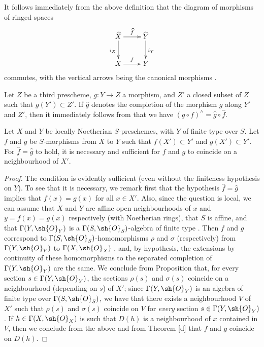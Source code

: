 \begin{env}[10.9.2]
\label{I.10.9.2}
It follows immediately from the above definition that the diagram of morphisms of ringed spaces
\[
  \xymatrix{
    \widehat{X}\ar[r]^{\widehat{f}}\ar[d]_{i_X} &
    \widehat{Y}\ar[d]^{i_Y}\\
    X\ar[r]^f &
    Y
  }
\]
commutes, with the vertical arrows being the canonical morphisms .
\end{env}

\begin{env}[10.9.3]
\label{I.10.9.3}
Let $Z$ be a third prescheme, $g:Y\to Z$ a morphism, and $Z'$ a closed subset of $Z$ such that $g(Y')\subset Z'$.
If $\widehat{g}$ denotes the completion of the morphism $g$ along $Y'$ and $Z'$, then it immediately follows from  that we have $(g\circ f)^\wedge=\widehat{g}\circ\widehat{f}$.
\end{env}

\begin{proposition}[10.9.4]
\label{I.10.9.4}
Let $X$ and $Y$ be locally Noetherian $S$-preschemes, with $Y$ of finite type over $S$.
Let $f$ and $g$ be $S$-morphisms from $X$ to $Y$ such that $f(X')\subset Y'$ and $g(X')\subset Y'$.
For $\widehat{f}=\widehat{g}$ to hold, it is necessary and sufficient for $f$ and $g$ to coincide on a neighbourhood of $X'$.
\end{proposition}

\begin{proof}
The condition is evidently sufficient (even without the finiteness hypothesis on $Y$).
To see that it is necessary, we remark first that the hypothesis $\widehat{f}=\widehat{g}$ implies that $f(x)=g(x)$ for all $x\in X'$.
Also, since the question is local, we can assume that $X$ and $Y$ are affine open neighbourhoods of $x$ and $y=f(x)=g(x)$ respectively (with Noetherian rings), that $S$ is affine, and that $\Gamma(Y,\sh{O}_Y)$ is a $\Gamma(S,\sh{O}_S)$-algebra of finite type .
Then $f$ and $g$ correspond to $\Gamma(S,\sh{O}_S)$-homomorphisms $\rho$ and $\sigma$ (respectively) from $\Gamma(Y,\sh{O}_Y)$ to $\Gamma(X,\sh{O}_X)$ , and, by hypothesis, the extensions by continuity of these homomorphisms to the separated completion of $\Gamma(Y,\sh{O}_Y)$ are the same.
We conclude from Proposition  that, for every section $s\in\Gamma(Y,\sh{O}_Y)$, the sections $\rho(s)$ and $\sigma(s)$ coincide on a neighbourhood (depending on $s$) of $X'$; since $\Gamma(Y,\sh{O}_Y)$ is an algebra of finite type over $\Gamma(S,\sh{O}_S)$, we have that there exists a neighbourhood $V$ of $X'$ such that $\rho(s)$ and $\sigma(s)$ coincide on $V$ for \emph{every} section $s\in\Gamma(Y,\sh{O}_Y)$.
If $h\in\Gamma(X,\sh{O}_X)$ is such that $D(h)$ is a neighbourhood of $x$ contained in $V$, then we conclude from the above and from Theorem [d] that $f$ and $g$ coincide on $D(h)$.
\end{proof}

